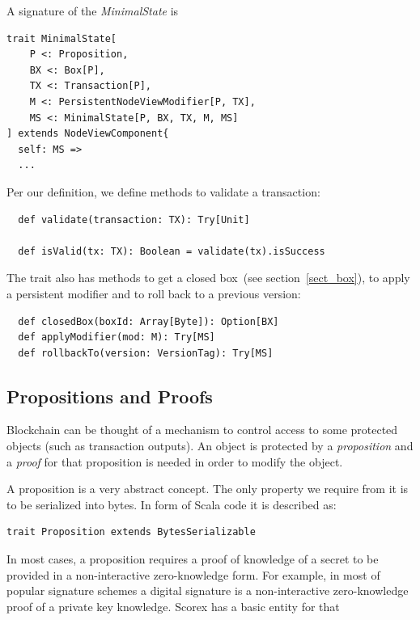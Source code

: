 \documentclass[]{report}   %
\begin{document}
A signature of the \textit{MinimalState} is

\begin{lstlisting}
trait MinimalState[
    P <: Proposition,
    BX <: Box[P],
    TX <: Transaction[P],
    M <: PersistentNodeViewModifier[P, TX],
    MS <: MinimalState[P, BX, TX, M, MS]
] extends NodeViewComponent{
  self: MS =>  
  ...
\end{lstlisting}

Per our definition, we define methods to validate a transaction: 

\begin{lstlisting}
  def validate(transaction: TX): Try[Unit]

  def isValid(tx: TX): Boolean = validate(tx).isSuccess
\end{lstlisting}

The trait also has methods to get a closed box~(see section~\ref{sect_box}), to apply a persistent modifier and to roll back to a previous version: 

\begin{lstlisting}
  def closedBox(boxId: Array[Byte]): Option[BX]
  def applyModifier(mod: M): Try[MS]
  def rollbackTo(version: VersionTag): Try[MS]
\end{lstlisting}


\subsection{Propositions and Proofs}

Blockchain can be thought of a mechanism to control access to some protected objects (such as transaction outputs). An object is protected by a {\em proposition} and a {\em proof} for that proposition is needed in order to modify the object.


A proposition is a very abstract concept. The only property we require from it is to be serialized into bytes. In form of Scala code it is described as: 	

\small{
\begin{lstlisting}
trait Proposition extends BytesSerializable
\end{lstlisting}
}
In most cases, a proposition requires a proof of knowledge of a secret to be provided in a non-interactive zero-knowledge form. For example, in most of popular signature schemes a digital signature is a non-interactive zero-knowledge proof of a private key knowledge. Scorex has a basic entity for that
\end{document}
